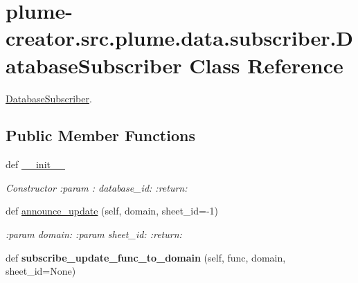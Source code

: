 \hypertarget{classplume-creator_1_1src_1_1plume_1_1data_1_1subscriber_1_1_database_subscriber}{}\section{plume-\/creator.src.\+plume.\+data.\+subscriber.\+Database\+Subscriber Class Reference}
\label{classplume-creator_1_1src_1_1plume_1_1data_1_1subscriber_1_1_database_subscriber}


\hyperlink{classplume-creator_1_1src_1_1plume_1_1data_1_1subscriber_1_1_database_subscriber}{Database\+Subscriber}.  


\subsection*{Public Member Functions}
\begin{DoxyCompactItemize}
\item 
def \hyperlink{classplume-creator_1_1src_1_1plume_1_1data_1_1subscriber_1_1_database_subscriber_a31d40f63e3543ba3b3b39e4938f0354f}{\+\_\+\+\_\+init\+\_\+\+\_\+}\hypertarget{classplume-creator_1_1src_1_1plume_1_1data_1_1subscriber_1_1_database_subscriber_a31d40f63e3543ba3b3b39e4938f0354f}{}\label{classplume-creator_1_1src_1_1plume_1_1data_1_1subscriber_1_1_database_subscriber_a31d40f63e3543ba3b3b39e4938f0354f}

\begin{DoxyCompactList}\small\item\em Constructor \+:param \+: database\+\_\+id\+: \+:return\+: \end{DoxyCompactList}\item 
def \hyperlink{classplume-creator_1_1src_1_1plume_1_1data_1_1subscriber_1_1_database_subscriber_a6e9ccc58c27b26e87091f170bb71b121}{announce\+\_\+update} (self, domain, sheet\+\_\+id=-\/1)\hypertarget{classplume-creator_1_1src_1_1plume_1_1data_1_1subscriber_1_1_database_subscriber_a6e9ccc58c27b26e87091f170bb71b121}{}\label{classplume-creator_1_1src_1_1plume_1_1data_1_1subscriber_1_1_database_subscriber_a6e9ccc58c27b26e87091f170bb71b121}

\begin{DoxyCompactList}\small\item\em \+:param domain\+: \+:param sheet\+\_\+id\+: \+:return\+: \end{DoxyCompactList}\item 
def {\bfseries subscribe\+\_\+update\+\_\+func\+\_\+to\+\_\+domain} (self, func, domain, sheet\+\_\+id=None)\hypertarget{classplume-creator_1_1src_1_1plume_1_1data_1_1subscriber_1_1_database_subscriber_af35e840394499d8fc2a22edafb126a29}{}\label{classplume-creator_1_1src_1_1plume_1_1data_1_1subscriber_1_1_database_subscriber_af35e840394499d8fc2a22edafb126a29}

\end{DoxyCompactItemize}


